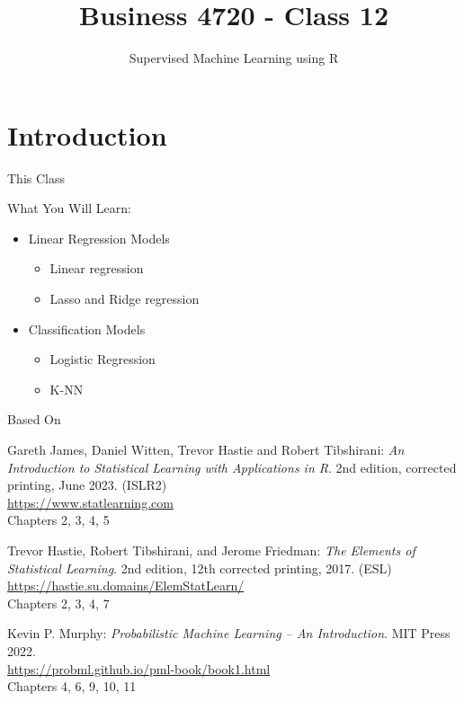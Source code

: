 \documentclass[ignorenonframetext,xcolor=x11names]{beamer}
\title{Business 4720 - Class 12}
\subtitle{Supervised Machine Learning using R}
\begin{document}
\begin{frame}[label=full]{}
  \titlepage
  \footnotesize
  
\end{frame}

\section{Introduction}

\begin{frame}[label=full]{This Class}

\begin{block}{What You Will Learn:}
\begin{itemize}
  \item Linear Regression Models
  \begin{itemize}
     \item Linear regression
     \item Lasso and Ridge regression
  \end{itemize}
  \item Classification Models
  \begin{itemize}
    \item Logistic Regression
    \item K-NN
  \end{itemize}
\end{itemize}
\end{block}
\end{frame}

\begin{frame}[label=full]{Based On}
\small
\begin{block}{}
Gareth James, Daniel Witten, Trevor Hastie and Robert Tibshirani: \emph{An Introduction to Statistical Learning with Applications in R}. 2nd edition, corrected printing, June 2023. (ISLR2) \\
\vspace{1mm}
\url{https://www.statlearning.com} \\
\vspace{1mm}
Chapters 2, 3, 4, 5
\end{block}

\begin{block}{}
Trevor Hastie, Robert Tibshirani, and Jerome Friedman: \emph{The Elements of Statistical Learning}. 2nd edition, 12th corrected printing, 2017. (ESL) \\
\vspace{1mm}
\url{https://hastie.su.domains/ElemStatLearn/} \\
\vspace{1mm}
Chapters 2, 3, 4, 7
\end{block}

\begin{block}{}
Kevin P. Murphy: \emph{Probabilistic Machine Learning -- An Introduction}. MIT Press 2022. \\
\vspace{1mm}
\url{https://probml.github.io/pml-book/book1.html} \\
\vspace{1mm}
Chapters 4, 6, 9, 10, 11
\end{block}
\end{frame}
\end{document}
